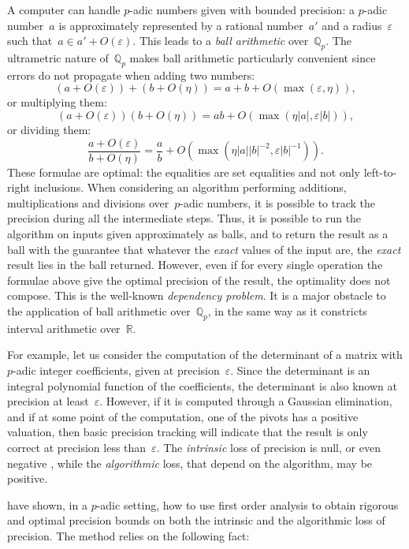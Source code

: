 \documentclass{sig-alternate}
\theoremstyle{definition}
\theoremstyle{remark}
\newcommand{\Q}{\mathbb{Q}}
\newcommand{\Qp}{\Q_p}
\newcommand\padic{$p$-adic\xspace}
\newcommand\abs[1]{\left|#1\right|}
\begin{document}
A computer can handle \padic numbers given with bounded precision: a \padic
number~$a$ is approximately represented by a rational number~$a'$ and a
radius~$\varepsilon$ such that~$a \in a' + O(\varepsilon)$. This leads to a 
\emph{ball arithmetic} over~$\Qp$.
The ultrametric nature of~$\Qp$ makes ball arithmetic particularly convenient
since errors do not propagate when adding two numbers:
\[ \left(a+O(\varepsilon)\right) + \left( b + O(\eta) \right) = a + b + O(\max(\varepsilon, \eta)), \]
or multiplying them:
\[  \left(a+O(\varepsilon)\right) \left( b + O(\eta) \right) = ab + O(\max(\eta\abs a, \varepsilon\abs b)), \]
or dividing them:
\[ \frac{a+O(\varepsilon)}{b+O(\eta)} = \frac{a}{b} + O(\max(\eta \abs a \abs{b}^{-2}, \varepsilon \abs{b}^{-1})). \]
These formulae are optimal: the equalities are set equalities and not only
left-to-right inclusions.  When considering an algorithm performing additions,
multiplications and divisions over~\padic numbers, it is possible to track the
precision during all the intermediate steps. Thus, it is possible to run the
algorithm on inputs given approximately as balls, and to return the result as a
ball with the guarantee that whatever the \emph{exact} values of the input are,
the \emph{exact} result lies in the ball returned.  However, even if for every 
single operation the formulae above give the optimal precision of the result,
the optimality does not compose.  This is the well-known \emph{dependency
problem}. It is a major obstacle to the application of ball arithmetic
over~$\Qp$, in the same way as it constricts interval arithmetic over~$\mathbb R$.

For example, let us consider the computation of the determinant of a matrix
with $p$-adic integer coefficients, given at precision~$\varepsilon$.  Since
the determinant is an integral polynomial function of the coefficients, the
determinant is also known at precision at least~$\varepsilon$.  However, if it
is computed through a Gaussian elimination, and if at some point of the
computation, one of the pivots has a positive valuation, then basic precision
tracking will indicate that the result is only correct at precision less
than~$\varepsilon$.  The \emph{intrinsic} loss of precision is null, or even
negative \parencite{CarRoeVac15}, while the \emph{algorithmic} loss, that
depend on the algorithm, may be positive.

\Textcite{CarRoeVac14} have shown, in a $p$-adic setting, how to use first
order analysis to obtain rigorous and optimal precision bounds on both the intrinsic and the algorithmic loss of precision.
The method relies on
the following fact:
\end{document}
